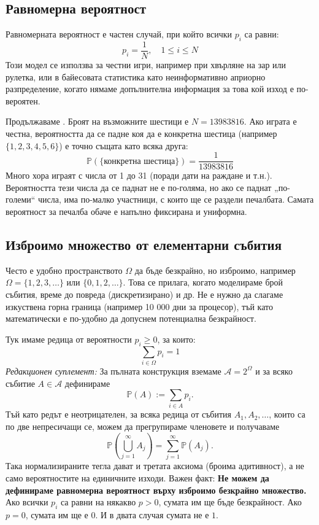 \subsection{Равномерна вероятност}
Равномерната вероятност е частен случай, при който всички $p_i$ са равни:
\[ p_i = \frac{1}{N}, \quad 1 \le i \le N \]
Този модел се използва за честни игри, например при хвърляне на зар или рулетка, или в байесовата статистика като неинформативно априорно разпределение, когато нямаме допълнителна информация за това кой изход е по-вероятен.

\begin{example}[Тото 6/49]\label{ex:02-1}
Продължаваме . Броят на възможните шестици е $N = 13983816$. Ако играта е честна, вероятността да се падне коя да е конкретна шестица (например $\{1, 2, 3, 4, 5, 6\}$) е точно същата като всяка друга:
\[ \mathbb{P}(\{\text{конкретна шестица}\}) = \frac{1}{13983816} \]
Много хора играят с числа от 1 до 31 (поради дати на раждане и т.н.). Вероятността тези числа да се паднат не е по-голяма, но ако се паднат „по-големи“ числа, има по-малко участници, с които ще се раздели печалбата. Самата вероятност за печалба обаче е напълно фиксирана и униформна.

\end{example}

\subsection{Изброимо множество от елементарни събития}
Често е удобно пространството $\Omega$ да бъде безкрайно, но изброимо, например $\Omega = \{1, 2, 3, \dots\}$ или $\{0, 1, 2, \dots\}$. Това се прилага, когато моделираме брой събития, време до повреда (дискретизирано) и др. Не е нужно да слагаме изкуствена горна граница (например 10 000 дни за процесор), тъй като математически е по-удобно да допуснем потенциална безкрайност.

Тук имаме редица от вероятности $p_i \ge 0$, за които:
\[ \sum_{i\in\Omega} p_i = 1 \]
\emph{Редакционен суплемент:} За пълната конструкция вземаме
$\mathcal{A}=2^\Omega$ и за всяко събитие $A\in\mathcal{A}$ дефинираме
\[ \mathbb{P}(A) := \sum_{i\in A} p_i . \]
Тъй като редът е неотрицателен, за всяка редица от събития
$A_1,A_2,\dots$, които са по две непресичащи се, можем да прегрупираме
членовете и получаваме
\[ \mathbb{P}\left(\bigcup_{j=1}^{\infty} A_j\right)
   = \sum_{j=1}^{\infty} \mathbb{P}(A_j) . \]
Така нормализираните тегла дават и третата аксиома (броима адитивност),
а не само вероятностите на единичните изходи.
Важен факт: \textbf{Не можем да дефинираме равномерна вероятност върху изброимо безкрайно множество.} Ако всички $p_i$ са равни на някакво $p > 0$, сумата им ще бъде безкрайност. Ако $p = 0$, сумата им ще е $0$. И в двата случая сумата не е $1$.

